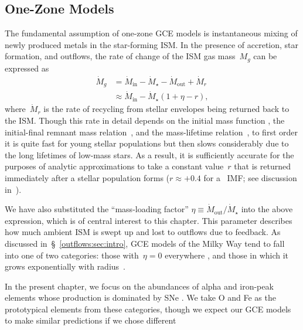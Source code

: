 \subsection{One-Zone Models}
\label{outflows:sec:gce:onezone}
The fundamental assumption of one-zone GCE models is instantaneous
mixing of newly produced metals in the star-forming ISM.
In the presence of accretion, star formation, and outflows, the rate of
change of the ISM gas mass~$M_g$ can be expressed as
\begin{equation}\begin{split}
\dot{M}_g &= \dot{M}_\text{in} - \dot{M}_\star - \dot{M}_\text{out} +
\dot{M}_r
\\
&\approx \dot{M}_\text{in} - \dot{M}_\star(1 + \eta - r),
\label{outflows:eq:mdot-gas}
\end{split}\end{equation}
where~$\dot{M}_r$ is the rate of recycling from stellar envelopes being
returned back to the ISM.
Though this rate in detail depends on the initial mass function
\citep[IMF; e.g.,][]{Salpeter1955, Kroupa2001, Chabrier2003}, the
initial-final remnant mass relation~\citep[e.g.,][]{Kalirai2008}, and the
mass-lifetime relation~\citep[e.g.,][]{Larson1974, Maeder1989, Hurley2000},
to first order it is quite fast for young stellar populations but then
slows considerably due to the long lifetimes of low-mass stars.
As a result, it is sufficiently accurate for the purposes of analytic
approximations to take a constant value~$r$ that is returned immediately
after a stellar population forms ($r \approx +0.4$ for
a~\citealt{Kroupa2001} IMF; see discussion in~\citealt{Weinberg2017b}).
\par
We have also substituted the ``mass-loading factor''
$\eta \equiv \dot{M}_\text{out} / \dot{M}_\star$ into the above expression,
which is of central interest to this chapter.
This parameter describes how much ambient ISM is swept up and lost to outflows
due to feedback.
As discussed in~\S~\ref{outflows:sec:intro}, GCE models of the Milky Way
tend to fall into one of two categories: those with~$\eta = 0$ everywhere
\citep[e.g.,][]{Spitoni2021}, and those in which it grows exponentially
with radius~\citep[e.g.,][]{Johnson2021}.
\par
In the present chapter, we focus on the abundances of alpha and
iron-peak elements whose production is dominated by SNe
\citep[e.g.,][]{Johnson2019}.
We take O and Fe as the prototypical elements from these categories, though
we expect our GCE models to make similar predictions if we chose different
